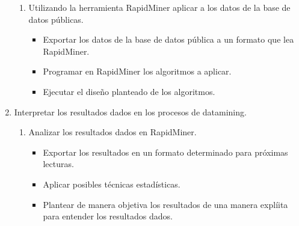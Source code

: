\documentclass[a4paper, 11pt, oneside]{article}
\theoremstyle{definition}
\theoremstyle{remark}
\begin{document}
\begin{enumerate}
    \begin{enumerate}
      \item Utilizando la herramienta RapidMiner aplicar a los datos de la base de datos públicas.
      \begin{itemize}
        \item Exportar los datos de la base de datos pública a un formato que lea RapidMiner.
        \item Programar en RapidMiner los algoritmos a aplicar.
        \item Ejecutar el diseño planteado de los algoritmos.
      \end{itemize}
  \end{enumerate}
 \item Interpretar los resultados dados en los procesos de datamining.
    \begin{enumerate}
      \item Analizar los resultados dados en RapidMiner.
      \begin{itemize}
        \item Exportar los resultados en un formato determinado para próximas lecturas.
        \item Aplicar posibles técnicas estadísticas.
        \item Plantear de manera objetiva los resultados de una manera explíita para entender los resultados dados.
      \end{itemize}
  \end{enumerate}
  
  
\end{enumerate}

\clearpage
\end{document}
